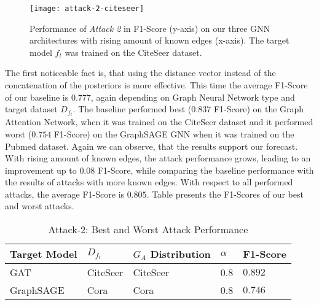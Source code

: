            \begin{figure}[h]
                \begin{center}
                    \texttt{[image: attack-2-citeseer]}
                    \caption[Attack 2 - $D_{f_t} = CiteSeer$]{Performance of \emph{Attack 2} in F1-Score (y-axis) on our three GNN architectures with rising amount of known edges (x-axis). The target model $f_t$ was trained on the CiteSeer dataset.}
                    \label{figure:eval-att2-citeseer}
                \end{center}
            \end{figure}

            The first noticeable fact is, that using the distance vector instead of the concatenation of the posteriors is more effective.
            This time the average F1-Score of our baseline is $0.777$, again depending on Graph Neural Network type and target dataset $D_{f_t}$.
            The baseline performed best ($0.837$ F1-Score) on the Graph Attention Network, when it was trained on the CiteSeer dataset and it performed worst ($0.754$ F1-Score) on the GraphSAGE GNN when it was trained on the Pubmed dataset.
            Again we can observe, that the results support our forecast.
            With rising amount of known edges, the attack performance grows, leading to an improvement up to $0.08$ F1-Score, while comparing the baseline performance with the results of attacks with more known edges.
            With respect to all performed attacks, the average F1-Score is $0.805$.
            Table  presents the F1-Scores of our best and worst attacks.
            
            \vspace{0.48cm}
            \begin{table}[!h]
                \centering
                \footnotesize
                \begin{tabular}{l|l|l|l|l|}
                \toprule
                Target Model & $D_{f_t}$ & $G_A$ Distribution & $\alpha$ & F1-Score \\
                \midrule
                GAT       & CiteSeer & CiteSeer & 0.8 & $0.892$ \\
                GraphSAGE & Cora     & Cora     & 0.8 & $0.746$ \\
                
                \bottomrule
                \end{tabular}
                \caption{Attack-2: Best and Worst Attack Performance}
                \label{table:attack2-best-and-worst-performance}
            \end{table}

